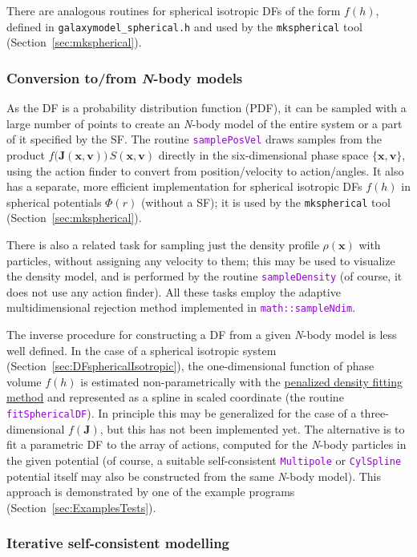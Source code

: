 \documentclass[12pt]{article}
\newcommand{\Nbody}{\textsl{N}-body\xspace}
\newcommand{\ttt}[1]{\textcolor{darkviolet}{\texttt{#1}}}
\newcommand{\bv}{\boldsymbol{v}}
\newcommand{\bx}{\boldsymbol{x}}
\newcommand{\bJ}{\boldsymbol{J}}
\begin{document}
There are analogous routines for spherical isotropic DFs of the form $f(h)$, defined in \texttt{galaxymodel_spherical.h} and used by the \texttt{mkspherical} tool (Section~\ref{sec:mkspherical}).


\subsubsection{Conversion to/from \Nbody models}  \label{sec:Nbody}

As the DF is a probability distribution function (PDF), it can be sampled with a large number of points to create an \Nbody model of the entire system or a part of it specified by the SF. The routine \ttt{samplePosVel} draws samples from the product $f\big(\bJ(\bx,\bv)\big)\,S(\bx,\bv)$ directly in the six-dimensional phase space $\{\bx,\bv\}$, using the action finder to convert from position/velocity to action/angles. It also has a separate, more efficient implementation for spherical isotropic DFs $f(h)$ in spherical potentials $\Phi(r)$ (without a SF); it is used by the \texttt{mkspherical} tool (Section~\ref{sec:mkspherical}).

There is also a related task for sampling just the density profile $\rho(\bx)$ with particles, without assigning any velocity to them; this may be used to visualize the density model, and is performed by the routine \ttt{sampleDensity} (of course, it does not use any action finder). All these tasks employ the adaptive multidimensional rejection method implemented in \ttt{math::sampleNdim}.

The inverse procedure for constructing a DF from a given \Nbody model is less well defined. In the case of a spherical isotropic system (Section~\ref{sec:DFsphericalIsotropic}), the one-dimensional function of phase volume $f(h)$ is estimated non-parametrically with the \hyperref[sec:SplineFitting]{penalized density fitting method} and represented as a spline in scaled coordinate (the routine \ttt{fitSphericalDF}). In principle this may be generalized for the case of a three-dimensional $f(\bJ)$, but this has not been implemented yet. The alternative is to fit a parametric DF to the array of actions, computed for the \Nbody particles in the given potential (of course, a suitable self-consistent \ttt{Multipole} or \ttt{CylSpline} potential itself may also be constructed from the same \Nbody model). This approach is demonstrated by one of the example programs (Section~\ref{sec:ExamplesTests}).


\subsubsection{Iterative self-consistent modelling}  \label{sec:SCM}
\end{document}
